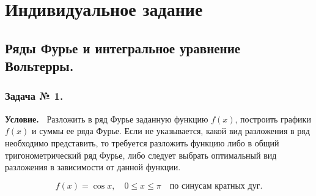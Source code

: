 \documentclass[12pt]{article}
\begin{document}
	\newpage
	\section{Индивидуальное задание}

	
	\subsection{Ряды Фурье и интегральное уравнение Вольтерры.}
%	
	

\subsubsection*{\center Задача № 1.}
{\bf Условие.~}
Разложить в ряд Фурье заданную функцию $f(x)$, построить графики $f(x)$ и суммы ее ряда Фурье. Если не указывается, какой вид разложения в ряд необходимо представить, то требуется разложить функцию либо в общий тригонометрический ряд Фурье, либо следует выбрать оптимальный вид разложения в зависимости от данной функции.


\begin{equation}
	f(x) = \cos{x}, \quad 0 \leqslant x \leqslant \pi \quad\text{по синусам кратных дуг}.
\end{equation}
\end{document}
